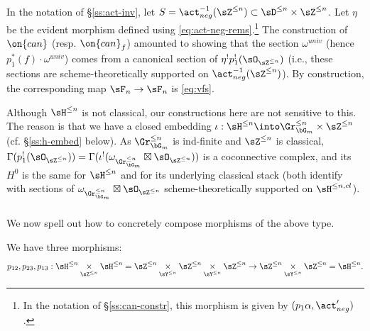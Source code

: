 \begin{example}
\notready\label{e:vfs}

In the notation of \S \ref{ss:act-inv}, let
$S = \act_{neg}^{-1}(\sZ^{\leq n}) \subset \sD^{\leq n} \times \sZ^{\leq n}$.
Let $\eta$ be the evident morphism defined using \eqref{eq:act-neg-rems}.\footnote{In the notation of \S \ref{ss:can-constr}, this
morphism is given by $(p_1\alpha,\act_{neg}^{\prime})$.}
The construction of $\on{can}$ (resp. $\on{can}_f$) amounted to showing
that the section $\omega^{univ}$ (hence $p_1^*(f)\cdot \omega^{univ}$)
comes from a canonical section of
$\eta^!p_1^!(\sO_{\sZ^{\leq n}})$ (i.e., these sections are scheme-theoretically
supported on $\act_{neg}^{-1}(\sZ^{\leq n}) $). By construction,
the corresponding map $\sF_n \to \sF_n$ is \eqref{eq:vfs}.

\end{example}

\begin{rem}
\notready\label{r:h-cl}

Although
$\sH^{\leq n}$ is not classical, our constructions
here are not sensitive to this. The reason is that
we have a closed embedding $\iota:\sH^{\leq n} \into
\Gr_{\bG_m}^{\leq n} \times \sZ^{\leq n}$
(cf. \S \ref{ss:h-embed} below). As
$\Gr_{\bG_m}^{\leq n}$ is ind-finite and
$\sZ^{\leq n}$ is classical,
$\Gamma(p_1^!(\sO_{\sZ^{\leq n}})) = \Gamma(\iota^!(\omega_{\Gr_{\bG_m}^{\leq n}}
\boxtimes \sO_{\sZ^{\leq n}}))$ is a coconnective complex,
and its $H^0$ is the same for $\sH^{\leq n}$ and for its
underlying classical stack (both identify with
sections of $\omega_{\Gr_{\bG_m}^{\leq n}}
\boxtimes \sO_{\sZ^{\leq n}}$ scheme-theoretically supported
on $\sH^{\leq n,cl}$).

\end{rem}

\subsubsection{}\label{ss:sigma-comp}

We now spell out how to concretely compose morphisms of the above type.

We have three morphisms:
%
\[
p_{12},p_{23},p_{13}:
\sH^{\leq n} \underset{\sZ^{\leq n}}{\times} \sH^{\leq n} =
\sZ^{\leq n} \underset{\sY^{\leq n}}{\times}
\sZ^{\leq n} \underset{\sY^{\leq n}}{\times} \sZ^{\leq n}
\to
\sZ^{\leq n} \underset{\sY^{\leq n}}{\times} \sZ^{\leq n} =
\sH^{\leq n}.
\]

